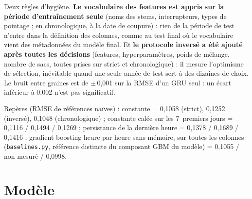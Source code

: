 \documentclass[11pt,a4paper]{article}
\begin{document}
Deux règles d'hygiène. \textbf{Le vocabulaire des features est appris sur la période d'entraînement seule} (noms des stems, interrupteurs, types de pointage ; en chronologique, à la date de coupure) : rien de la période de test n'entre dans la définition des colonnes, comme au test final où le vocabulaire vient des métadonnées du modèle final. Et \textbf{le protocole inversé a été ajouté après toutes les décisions} (features, hyperparamètres, poids de mélange, nombre de sacs, toutes prises sur strict et chronologique) : il mesure l'optimisme de sélection, inévitable quand une seule année de test sert à des dizaines de choix. Le bruit entre graines est de $\pm$\,0,001 sur la RMSE d'un GRU seul : un écart inférieur à 0,002 n'est pas significatif.

Repères (RMSE de références naïves) : constante = 0,1058 (strict), 0,1252 (inversé), 0,1048 (chronologique) ; constante calée sur les 7~premiers jours = 0,1116 / 0,1494 / 0,1269 ; persistance de la dernière heure = 0,1378 / 0,1689 / 0,1416 ; gradient boosting heure par heure sans mémoire, sur toutes les colonnes (\texttt{baselines.py}, référence distincte du composant GBM du modèle) = 0,1055 / non mesuré / 0,0998.

\section{Modèle}\label{sec:modele}
\end{document}
